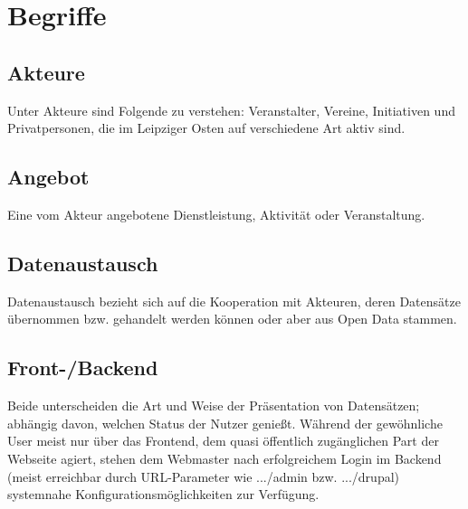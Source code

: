 \documentclass{swp}
\begin{document}
\\\\\\\\\\

\tableofcontents
\section{Begriffe}
\subsection{Akteure}
Unter Akteure sind Folgende zu verstehen: Veranstalter, Vereine, Initiativen und Privatpersonen, die im Leipziger Osten auf verschiedene Art aktiv sind.
\subsection{Angebot}
Eine vom Akteur angebotene Dienstleistung, Aktivit\"at oder Veranstaltung.
\subsection{Datenaustausch}
Datenaustausch bezieht sich auf die Kooperation mit Akteuren, deren Datens\"atze \"ubernommen bzw. \glqq gehandelt\grqq{} werden k\"onnen oder aber aus Open Data stammen.
\subsection{Front-/Backend}
Beide unterscheiden die Art und Weise der Pr\"asentation von Datens\"atzen; abh\"angig davon, welchen Status der Nutzer genie{\ss}t. W\"ahrend der gew\"ohnliche User meist nur \"uber das Frontend, dem quasi \"offentlich zug\"anglichen Part der Webseite agiert, stehen dem Webmaster nach erfolgreichem Login im Backend (meist erreichbar durch URL-Parameter wie \glqq .../admin\grqq{} bzw. \glqq .../drupal\grqq{}) systemnahe Konfigurationsm\"oglichkeiten zur Verf\"ugung.\\
\end{document}
